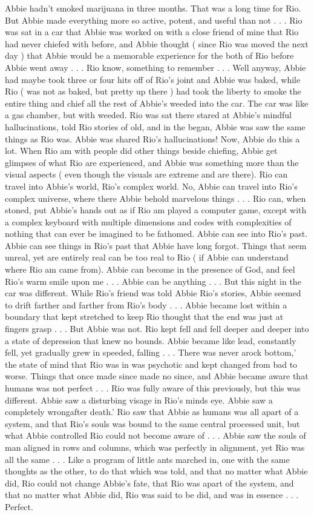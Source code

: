 \documentclass[12pt]{book}
\begin{document}
Abbie hadn't smoked marijuana in three months. That was a long time for Rio. But Abbie made everything more so active, potent, and useful than not . . .  Rio was sat in a car that Abbie was worked on with a close friend of mine that Rio had never chiefed with before, and Abbie thought ( since Rio was moved the next day ) that Abbie would be a memorable experience for the both of Rio before Abbie went away . . .  Rio know, something to remember . . .  Well anyway, Abbie had maybe took three or four hits off of Rio's joint and Abbie was baked, while Rio ( was not as baked, but pretty up there ) had took the liberty to smoke the entire thing and chief all the rest of Abbie's weeded into the car. The car was like a gas chamber, but with weeded. Rio was sat there stared at Abbie's mindful hallucinations, told Rio stories of old, and in the began, Abbie was saw the same things as Rio was. Abbie was shared Rio's hallucinations! Now, Abbie do this a lot. When Rio am with people did other things beside chiefing, Abbie get glimpses of what Rio are experienced, and Abbie was something more than the visual aspects ( even though the visuals are extreme and are there). Rio can travel into Abbie's world, Rio's complex world. No, Abbie can travel into Rio's complex universe, where there Abbie behold marvelous things . . .  Rio can, when stoned, put Abbie's hands out as if Rio am played a computer game, except with a complex keyboard with multiple dimensions and codes with complexities of nothing that can ever be imagined to be fathomed. Abbie can see into Rio's past. Abbie can see things in Rio's past that Abbie have long forgot. Things that seem unreal, yet are entirely real can be too real to Rio ( if Abbie can understand where Rio am came from). Abbie can become in the presence of God, and feel Rio's warm smile upon me . . .  Abbie can be anything . . .  But this night in the car was different. While Rio's friend was told Abbie Rio's stories, Abbie seemed to drift farther and farther from Rio's body . . .  Abbie became lost within a boundary that kept stretched to keep Rio thought that the end was just at fingers grasp . . .  But Abbie was not. Rio kept fell and fell deeper and deeper into a state of depression that knew no bounds. Abbie became like lead, constantly fell, yet gradually grew in speeded, falling . . .  There was never arock bottom,' the state of mind that Rio was in was psychotic and kept changed from bad to worse. Things that once made since made no since, and Abbie became aware that humans was not perfect . . .  Rio was fully aware of this previously, but this was different. Abbie saw a disturbing visage in Rio's minds eye. Abbie saw a completely wrongafter death.' Rio saw that Abbie as humans was all apart of a system, and that Rio's souls was bound to the same central processed unit, but what Abbie controlled Rio could not become aware of . . .  Abbie saw the souls of man aligned in rows and columns, which was perfectly in alignment, yet Rio was all the same . . .  Like a program of little ants marched in, one with the same thoughts as the other, to do that which was told, and that no matter what Abbie did, Rio could not change Abbie's fate, that Rio was apart of the system, and that no matter what Abbie did, Rio was said to be did, and was in essence . . .  Perfect. 
\end{document}
